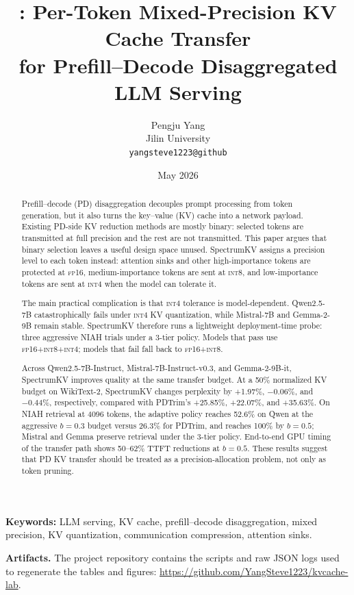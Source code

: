 \documentclass[11pt]{article}
\title{\vspace{-0.6em}\method{}: Per-Token Mixed-Precision KV Cache Transfer\\for Prefill--Decode Disaggregated LLM Serving\vspace{-0.25em}}
\author{Pengju Yang\\Jilin University\\\texttt{yangsteve1223@github}}
\date{May 2026}
\newcommand{\method}{SpectrumKV}
\newcommand{\niah}{NIAH}
\newcommand{\budget}{b}
\newcommand{\pct}{\%}
\newcommand{\fp}{\textsc{fp16}}
\newcommand{\intviii}{\textsc{int8}}
\newcommand{\intiv}{\textsc{int4}}
\theoremstyle{plain}
\theoremstyle{definition}
\begin{document}
\maketitle

\begin{abstract}
Prefill--decode (PD) disaggregation decouples prompt processing from token generation, but it also turns the key--value (KV) cache into a network payload.  Existing PD-side KV reduction methods are mostly binary: selected tokens are transmitted at full precision and the rest are not transmitted.  This paper argues that binary selection leaves a useful design space unused.  \method{} assigns a precision level to each token instead: attention sinks and other high-importance tokens are protected at \fp{}, medium-importance tokens are sent at \intviii{}, and low-importance tokens are sent at \intiv{} when the model can tolerate it.

The main practical complication is that \intiv{} tolerance is model-dependent.  Qwen2.5-7B catastrophically fails under \intiv{} KV quantization, while Mistral-7B and Gemma-2-9B remain stable.  \method{} therefore runs a lightweight deployment-time probe: three aggressive \niah{} trials under a 3-tier policy.  Models that pass use \fp{}+\intviii{}+\intiv{}; models that fail fall back to \fp{}+\intviii{}.

Across Qwen2.5-7B-Instruct, Mistral-7B-Instruct-v0.3, and Gemma-2-9B-it, \method{} improves quality at the same transfer budget.  At a 50\pct{} normalized KV budget on WikiText-2, \method{} changes perplexity by +1.97\pct{}, $-0.06$\pct{}, and $-0.44$\pct{}, respectively, compared with PDTrim's +25.85\pct{}, +22.07\pct{}, and +35.63\pct{}.  On \niah{} retrieval at 4096 tokens, the adaptive policy reaches 52.6\pct{} on Qwen at the aggressive $\budget=0.3$ budget versus 26.3\pct{} for PDTrim, and reaches 100\pct{} by $\budget=0.5$; Mistral and Gemma preserve retrieval under the 3-tier policy.  End-to-end GPU timing of the transfer path shows 50--62\pct{} TTFT reductions at $\budget=0.5$.  These results suggest that PD KV transfer should be treated as a precision-allocation problem, not only as token pruning.
\end{abstract}

\vspace{0.3em}
\noindent\textbf{Keywords:} LLM serving, KV cache, prefill--decode disaggregation, mixed precision, KV quantization, communication compression, attention sinks.

\noindent\textbf{Artifacts.} The project repository contains the scripts and raw JSON logs used to regenerate the tables and figures: \url{https://github.com/YangSteve1223/kvcache-lab}.
\end{document}
